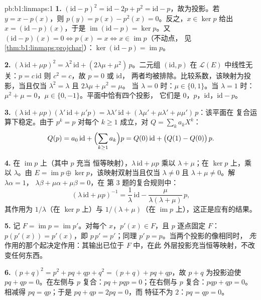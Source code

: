 \begin{solution}{pb:b1:linmaps:1}
\textbf{1.} $(\mathrm{id} - p)^2 = \mathrm{id} - 2p + p^2 =
\mathrm{id} - p$，故为投影。若 $y = x - p(x)$，则 $p(y) =
p(x) - p^2(x) = 0$。反之，$x \in \ker p$ 给出 $x =
(\mathrm{id} - p)(x)$，于是 $\operatorname{im}(\mathrm{id} - p) = \ker
p$。又 $(\mathrm{id} - p)(x) = 0 \iff p(x) = x \iff x \in
\operatorname{im} p$（不动点，
见\cref{thm:b1:linmaps:projchar}）：$\ker(\mathrm{id} - p) =
\operatorname{im} p$。

\textbf{2.} $(\lambda\,\mathrm{id} + \mu p)^2 =
\lambda^2\,\mathrm{id} + (2\lambda\mu + \mu^2)\,p$。二元组
$(\mathrm{id}, p)$ 在 $\mathcal{L}(E)$ 中线性无关：$p = c\,
\mathrm{id}$ 则 $c^2 = c$，故 $p = 0$ 或 $\mathrm{id}$，
两者均被排除。比较系数，该映射为投影，当且仅当
$\lambda^2 = \lambda$ 且 $2\lambda\mu + \mu^2 = \mu$。
当 $\lambda = 0$ 时：$\mu \in \{0, 1\}$。当 $\lambda = 1$ 时：$\mu^2 +
\mu = 0$，$\mu \in \{0, -1\}$。平面中恰有四个投影，
它们是 $0$，$p$，$\mathrm{id}$，$\mathrm{id} - p$。

\textbf{3.} $(\lambda\,\mathrm{id} + \mu p)(\lambda'\,\mathrm{id}
+ \mu' p) = \lambda\lambda'\,\mathrm{id} + (\lambda\mu' +
\mu\lambda' + \mu\mu')\,p$：该平面在
复合运算下稳定。由于 $p^k = p$ 对每个 $k \geq 1$ 成立，对 $Q =
\sum_k a_k X^k$：
\[
Q(p) = a_0\,\mathrm{id} + \Bigl(\sum_{k \geq 1} a_k\Bigr) p
= Q(0)\,\mathrm{id} + \bigl(Q(1) - Q(0)\bigr)\,p .
\]

\textbf{4.} 在 $\operatorname{im} p$ 上（其中 $p$ 充当
恒等映射），$\lambda\,\mathrm{id} + \mu p$ 乘以 $\lambda
+ \mu$；在 $\ker p$ 上，乘以 $\lambda$。由 $E = \operatorname{im} p
\oplus \ker p$，该映射双射当且仅当 $\lambda \neq 0$ 且
$\lambda + \mu \neq 0$。解 $\lambda\alpha = 1$，
$\lambda\beta + \mu\alpha + \mu\beta = 0$，在
第 3 题的复合规则中：
\[
(\lambda\,\mathrm{id} + \mu p)^{-1}
= \frac1\lambda\,\mathrm{id} -
\frac{\mu}{\lambda(\lambda + \mu)}\,p ,
\]
其作用为 $1/\lambda$（在 $\ker p$ 上）与 $1/(\lambda +
\mu)$（在 $\operatorname{im} p$ 上），这正是应有的结果。

\textbf{5.} 记 $F = \operatorname{im} p = \operatorname{im}
p'$。对每个 $x$，$p'(x) \in F$，且 $p$ 逐点固定 $F$：
$p(p'(x)) = p'(x)$，即 $p\,p' = p'$；同理 $p'\,p =
p$。当两个投影的像相同时，
\emph{先}作用的那个起决定作用：其输出已位于 $F$ 中，在此
外层投影充当恒等映射，不改变任何东西。

\textbf{6.} $(p + q)^2 = p^2 + pq + qp + q^2 = (p + q) + pq +
qp$，故 $p + q$ 为投影迫使 $pq + qp = 0$。在左侧与
$p$ 复合：$pq + pqp = 0$；在右侧与 $p$ 复合：$pqp + qp
= 0$。相减得 $pq = qp$；于是 $pq + qp = 2pq = 0$，而
特征不为 $2$：$pq = qp = 0$。


\end{solution}
